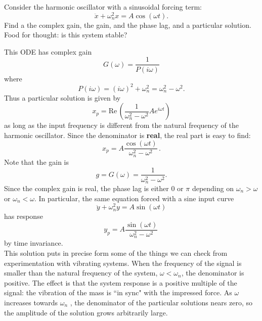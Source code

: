 \begin{example}
  Consider the harmonic oscillator with a sinusoidal forcing term:
  \begin{equation*}
    \ddot x+\omega _ n^2x=A\cos (\omega t).
  \end{equation*}
  Find a the complex gain, the gain, and the phase lag, and a particular solution.
  Food for thought: is this system stable?
\end{example}
This ODE has complex gain
\begin{equation*}
  G(\omega ) = \frac{1}{P(i\omega )}
\end{equation*}
where
\begin{equation*}
  \displaystyle  P(i\omega )=(i\omega )^2+\omega _ n^2=\omega _ n^2-\omega ^2.
\end{equation*}
Thus a particular solution is given by
\begin{equation*}
  x_ p=\mathrm{Re\, }\left(\frac{1}{\omega _ n^2-\omega ^2}Ae^{i\omega t}\right)
\end{equation*}
as long as the input frequency is different from the natural frequency of the harmonic oscillator.
Since the denominator is \textbf{real}, the real part is easy to find:
\begin{equation*}
  x_ p=A\frac{\cos (\omega t)}{\omega _ n^2-\omega ^2}\, .
\end{equation*}
Note that the gain is
\begin{equation*}
  g = G(\omega ) = \frac{1}{\omega _ n^2-\omega ^2}.
\end{equation*}
Since the complex gain is real, the phase lag is either
$0$ or $\pi$ depending on $\omega _ n > \omega$ or $\omega _ n < \omega$.
In particular, the same equation forced with a sine input curve
\begin{equation*}
  \ddot y+\omega _ n^2y=A\sin (\omega t)
\end{equation*}
has response
\begin{equation*}
  y_ p=A\frac{\sin (\omega t)}{\omega _ n^2-\omega ^2}\,
\end{equation*}
by time invariance.\\

This solution puts in precise form some of the things
we can check from experimentation with vibrating systems.
When the frequency of the signal is smaller than the natural frequency of the system,
$\omega < \omega _n$, the denominator is positive.
The effect is that the system response is a positive multiple of the signal:
the vibration of the mass is “in sync" with the impressed force.
As $\omega$ increases towards $\omega _n$ ,
the denominator of the particular solutions nears zero,
so the amplitude of the solution grows arbitrarily large.\\

